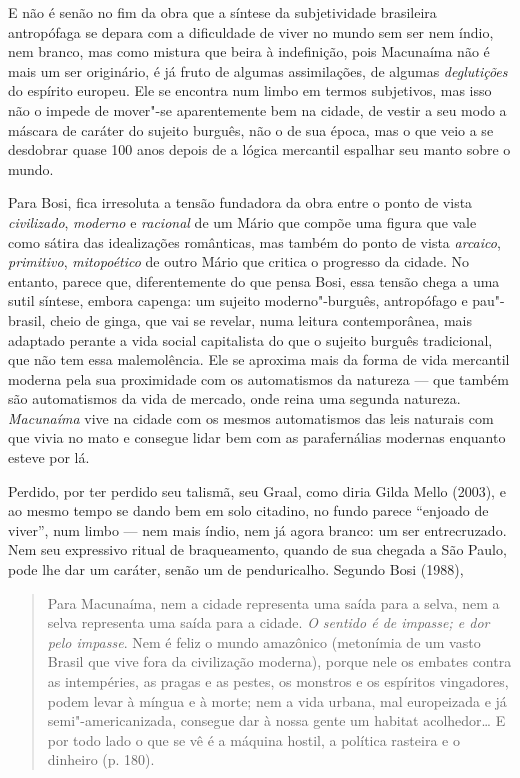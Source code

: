 E não é senão no fim da obra que a síntese da subjetividade brasileira
antropófaga se depara com a dificuldade de viver no mundo sem ser nem
índio, nem branco, mas como mistura que beira à indefinição, pois
Macunaíma não é mais um ser originário, é já fruto de algumas
assimilações, de algumas \emph{deglutições} do espírito europeu. Ele se
encontra num limbo em termos subjetivos, mas isso não o impede de
mover"-se aparentemente bem na cidade, de vestir a seu modo a máscara de
caráter do sujeito burguês, não o de sua época, mas o que veio a se
desdobrar quase 100 anos depois de a lógica mercantil espalhar seu manto
sobre o mundo.

Para Bosi, fica irresoluta a tensão fundadora da obra entre o ponto de
vista \emph{civilizado}, \emph{moderno} e \emph{racional} de um Mário
que compõe uma figura que vale como sátira das idealizações românticas,
mas também do ponto de vista \emph{arcaico}, \emph{primitivo},
\emph{mitopoético} de outro Mário que critica o progresso da cidade. No
entanto, parece que, diferentemente do que pensa Bosi, essa tensão chega
a uma sutil síntese, embora capenga: um sujeito moderno"-burguês,
antropófago e pau"-brasil, cheio de ginga, que vai se revelar, numa
leitura contemporânea, mais adaptado perante a vida social capitalista
do que o sujeito burguês tradicional, que não tem essa malemolência. Ele
se aproxima mais da forma de vida mercantil moderna pela sua proximidade
com os automatismos da natureza --- que também são automatismos da vida
de mercado, onde reina uma segunda natureza. \emph{Macunaíma} vive na
cidade com os mesmos automatismos das leis naturais com que vivia no
mato e consegue lidar bem com as parafernálias modernas enquanto esteve
por lá.

Perdido, por ter perdido seu talismã, seu Graal, como diria Gilda Mello
(2003), e ao mesmo tempo se dando bem em solo citadino, no fundo parece
``enjoado de viver'', num limbo --- nem mais índio, nem já agora branco:
um ser entrecruzado. Nem seu expressivo ritual de braqueamento, quando de sua
chegada a São Paulo, pode lhe dar um caráter, senão um de penduricalho.
Segundo Bosi (1988),

\begin{quote}
Para Macunaíma, nem a cidade representa uma saída para a selva, nem a
selva representa uma saída para a cidade. \emph{O sentido é de impasse;
e dor pelo impasse}. Nem é feliz o mundo amazônico (metonímia de um
vasto Brasil que vive fora da civilização moderna), porque nele os
embates contra as intempéries, as pragas e as pestes, os monstros e os
espíritos vingadores, podem levar à míngua e à morte; nem a vida urbana,
mal europeizada e já semi"-americanizada, consegue dar à nossa gente um
habitat acolhedor\ldots{} E por todo lado o que se vê é a máquina hostil, a
política rasteira e o dinheiro (p. 180).
\end{quote}

